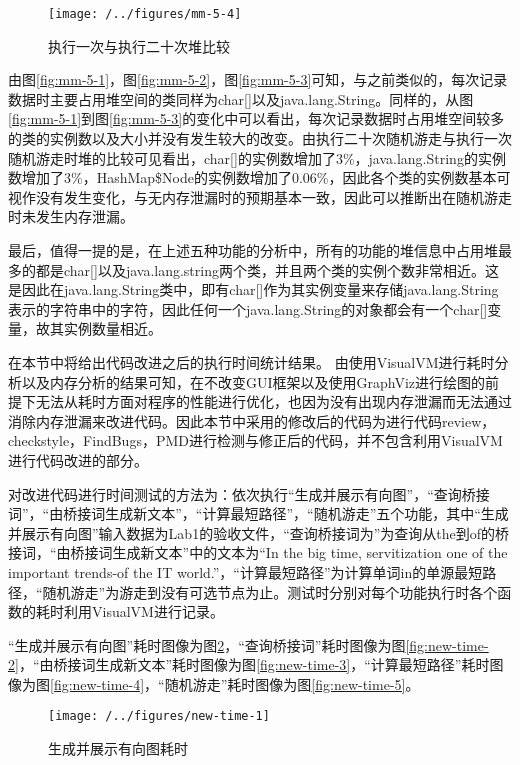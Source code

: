 \begin{figure}
\centering
\texttt{[image: /../figures/mm-5-4]}
\caption{执行一次与执行二十次堆比较}
\label{fig:mm-5-4}
\end{figure}

由图\ref{fig:mm-5-1}，图\ref{fig:mm-5-2}，图\ref{fig:mm-5-3}可知，与之前类似的，每次记录数据时主要占用堆空间的类同样为char[]以及java.lang.String。同样的，从图\ref{fig:mm-5-1}到图\ref{fig:mm-5-3}的变化中可以看出，每次记录数据时占用堆空间较多的类的实例数以及大小并没有发生较大的改变。由执行二十次随机游走与执行一次随机游走时堆的比较可见看出，char[]的实例数增加了3\%，java.lang.String的实例数增加了3\%，HashMap\$Node的实例数增加了0.06\%，因此各个类的实例数基本可视作没有发生变化，与无内存泄漏时的预期基本一致，因此可以推断出在随机游走时未发生内存泄漏。

最后，值得一提的是，在上述五种功能的分析中，所有的功能的堆信息中占用堆最多的都是char[]以及java.lang.string两个类，并且两个类的实例个数非常相近。这是因此在java.lang.String类中，即有char[]作为其实例变量来存储java.lang.String表示的字符串中的字符，因此任何一个java.lang.String的对象都会有一个char[]变量，故其实例数量相近。

在本节中将给出代码改进之后的执行时间统计结果。
由使用VisualVM进行耗时分析以及内存分析的结果可知，在不改变GUI框架以及使用GraphViz进行绘图的前提下无法从耗时方面对程序的性能进行优化，也因为没有出现内存泄漏而无法通过消除内存泄漏来改进代码。因此本节中采用的修改后的代码为进行代码review，checkstyle，FindBugs，PMD进行检测与修正后的代码，并不包含利用VisualVM进行代码改进的部分。

对改进代码进行时间测试的方法为：依次执行“生成并展示有向图”，“查询桥接词”，“由桥接词生成新文本”，“计算最短路径”，“随机游走”五个功能，其中“生成并展示有向图”输入数据为Lab1的验收文件，“查询桥接词为”为查询从the到of的桥接词，“由桥接词生成新文本”中的文本为“In the big time, servitization one of the important trends-of the IT world.”，“计算最短路径”为计算单词in的单源最短路径，“随机游走”为游走到没有可选节点为止。测试时分别对每个功能执行时各个函数的耗时利用VisualVM进行记录。

“生成并展示有向图”耗时图像为图\ref{fig:new-time-1}，“查询桥接词”耗时图像为图\ref{fig:new-time-2}，“由桥接词生成新文本”耗时图像为图\ref{fig:new-time-3}，“计算最短路径”耗时图像为图\ref{fig:new-time-4}，“随机游走”耗时图像为图\ref{fig:new-time-5}。

\begin{figure}
\centering
\texttt{[image: /../figures/new-time-1]}
\caption{生成并展示有向图耗时}
\label{fig:new-time-1}
\end{figure}

